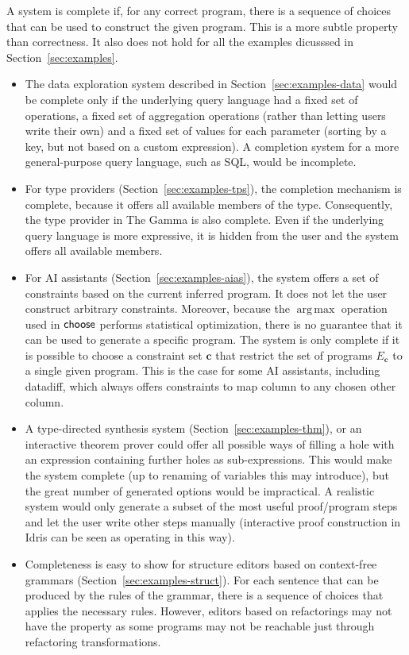 \documentclass[anonymous, a4paper,UKenglish,cleveref, autoref, thm-restate]{lipics-v2021}
\newcommand{\ident}[1]{\textsf{#1}}
\newcommand{\select}{\textnormal{\ident{choose}}}
\DeclareMathOperator{\argmax}{arg\,max}
\begin{document}
A system is complete if, for any correct program, there is a sequence of choices that can be
used to construct the given program. This is a more subtle property than correctness. It also
does not hold for all the examples dicusssed in Section~\ref{sec:examples}.

\begin{itemize}
\setlength{\itemsep}{5pt}
\item The data exploration system described in Section~\ref{sec:examples-data} would be complete
  only if the underlying query language had a fixed set of operations, a fixed set of aggregation
  operations (rather than letting users write their own) and a fixed set of values for each
  parameter (sorting by a key, but not based on a custom expression). A completion system for a
  more general-purpose query language, such as SQL, would be incomplete.

\item For type providers (Section~\ref{sec:examples-tps}), the completion mechanism is complete,
  because it offers all available members of the type. Consequently, the type provider in The
  Gamma is also complete. Even if the underlying query language is more expressive, it is hidden
  from the user and the system offers all available members.

\item For AI assistants (Section~\ref{sec:examples-aias}), the system offers a set of constraints
  based on the current inferred program. It does not let the user construct arbitrary constraints.
  Moreover, because the $\argmax$ operation used in $\select$ performs statistical
  optimization, there is no guarantee that it can be used to generate a specific program.
  The system is only complete if it is possible to choose a constraint set $\boldsymbol{c}$ that
  restrict the set of programs $E_{\boldsymbol{c}}$ to a single given program. This is the case
  for some AI assistants, including datadiff, which always offers constraints to map column to
  any chosen other column.

\item A type-directed synthesis system (Section~\ref{sec:examples-thm}), or an interactive theorem
  prover could offer all possible ways of filling a hole with an expression containing further
  holes as sub-expressions. This would make the system complete (up to renaming of variables this
  may introduce), but the great number of generated options would be impractical. A realistic
  system would only generate a subset of the most useful proof/program steps and let the user write
  other steps manually (interactive proof construction in Idris can be seen as operating in this way).

\item Completeness is easy to show for structure editors based on context-free grammars
  (Section~\ref{sec:examples-struct}). For each sentence that can be produced by the rules of
  the grammar, there is a sequence of choices that applies the necessary rules. However, editors
  based on refactorings may not have the property as some programs may not be reachable just
  through refactoring transformations.
\end{itemize}
\end{document}

